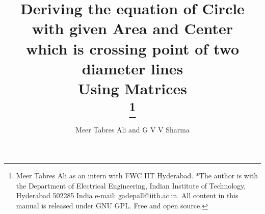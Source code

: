 \documentclass[journal,10pt,twocolumn]{article}
\begin{document}
\newtheorem{theorem}{Theorem}[section]
\newtheorem{problem}{Problem}
\newtheorem{proposition}{Proposition}[section]
\newtheorem{lemma}{Lemma}[section]
\newtheorem{corollary}[theorem]{Corollary}
\newtheorem{example}{Example}[section]
\newtheorem{definition}[problem]{Definition}
\newcommand{\BEQA}{\begin{eqnarray}}
\newcommand{\EEQA}{\end{eqnarray}}
\newcommand{\define}{\stackrel{\triangle}{=}}
\newcommand*\circled[1]{\tikz[baseline=(char.base)]{
    \node[shape=circle,draw,inner sep=2pt] (char) {#1};}}

%
\providecommand{\mbf}{\mathbf}
\providecommand{\pr}[1]{\ensuremath{\Pr\left(#1\right)}}
\providecommand{\re}[1]{\ensuremath{\text{Re}\left(#1\right)}}
\providecommand{\im}[1]{\ensuremath{\text{Im}\left(#1\right)}}
\providecommand{\qfunc}[1]{\ensuremath{Q\left(#1\right)}}
\providecommand{\sbrak}[1]{\ensuremath{{}\left[#1\right]}}
\providecommand{\lsbrak}[1]{\ensuremath{{}\left[#1\right.}}
\providecommand{\rsbrak}[1]{\ensuremath{{}\left.#1\right]}}
\providecommand{\brak}[1]{\ensuremath{\left(#1\right)}}
\providecommand{\lbrak}[1]{\ensuremath{\left(#1\right.}}
\providecommand{\rbrak}[1]{\ensuremath{\left.#1\right)}}
\providecommand{\cbrak}[1]{\ensuremath{\left\{#1\right\}}}
\providecommand{\lcbrak}[1]{\ensuremath{\left\{#1\right.}}
\providecommand{\rcbrak}[1]{\ensuremath{\left.#1\right\}}}
\newcommand{\sgn}{\mathop{\mathrm{sgn}}}
\providecommand{\system}{\overset{\mathcal{H}}{ \longleftrightarrow}}
\newcommand{\solution}{\noindent \textbf{Solution: }}
\newcommand{\cosec}{\,\text{cosec}\,}
\providecommand{\dec}[2]{\ensuremath{\overset{#1}{\underset{#2}{\gtrless}}}}
\newcommand{\myvec}[1]{\ensuremath{\begin{pmatrix}#1\end{pmatrix}}}
\newcommand{\mydet}[1]{\ensuremath{\begin{vmatrix}#1\end{vmatrix}}}
	\newcommand*{\permcomb}[4][0mu]{{{}^{#3}\mkern#1#2_{#4}}}
\newcommand*{\perm}[1][-3mu]{\permcomb[#1]{P}}
\newcommand*{\comb}[1][-1mu]{\permcomb[#1]{C}}
\let\vec\mathbf
\title{
{Deriving the equation of Circle with given Area and Center \\
which is crossing point of two diameter lines\\
Using Matrices}\\
\thanks{Meer Tabres Ali as an intern with FWC IIT Hyderabad. *The author is with the Department of Electrical Engineering, Indian Institute of Technology, Hyderabad 502285 India e-mail: gadepall@iith.ac.in. All content in this manual is released under GNU GPL. Free and open source.}
}
\author{Meer Tabres Ali and G V V Sharma}
\maketitle
\tableofcontents
\end{document}
